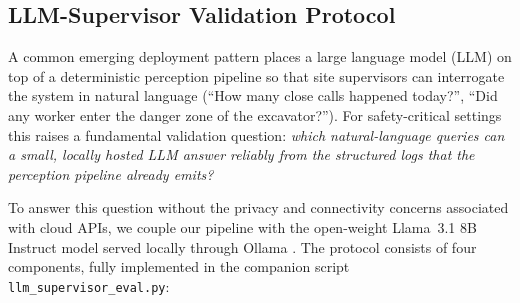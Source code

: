 \documentclass{article}
\begin{document}
\subsection{LLM-Supervisor Validation Protocol}
\label{sec:llm_supervisor_method}
A common emerging deployment pattern places a large language model (LLM) on top of a deterministic perception pipeline so that site supervisors can interrogate the system in natural language (``How many close calls happened today?'', ``Did any worker enter the danger zone of the excavator?''). For safety-critical settings this raises a fundamental validation question: \emph{which natural-language queries can a small, locally hosted LLM answer reliably from the structured logs that the perception pipeline already emits?}

To answer this question without the privacy and connectivity concerns associated with cloud APIs, we couple our pipeline with the open-weight Llama~3.1 8B Instruct model served locally through Ollama \cite{dubey2024llama,ollama2024}. The protocol consists of four components, fully implemented in the companion script \texttt{llm\_supervisor\_eval.py}:
\end{document}
